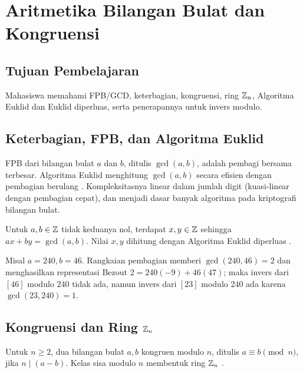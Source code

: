 \documentclass[../main.tex]{subfiles}
\begin{document}
\chapter{Aritmetika Bilangan Bulat dan Kongruensi}

\section{Tujuan Pembelajaran}
Mahasiswa memahami FPB/GCD, keterbagian, kongruensi, ring \(\mathbb{Z}_n\), Algoritma Euklid dan Euklid diperluas, serta penerapannya untuk invers modulo.

\section{Keterbagian, FPB, dan Algoritma Euklid}
\begin{definition}
FPB dari bilangan bulat \(a\) dan \(b\), ditulis \(\gcd(a,b)\), adalah pembagi bersama terbesar. Algoritma Euklid menghitung \(\gcd(a,b)\) secara efisien dengan pembagian berulang \citep{rosen}. Kompleksitasnya linear dalam jumlah digit (kuasi-linear dengan pembagian cepat), dan menjadi dasar banyak algoritma pada kriptografi bilangan bulat.
\end{definition}

\begin{theorem}
Untuk \(a,b\in\mathbb{Z}\) tidak keduanya nol, terdapat \(x,y\in\mathbb{Z}\) sehingga \(ax+by=\gcd(a,b)\). Nilai \(x,y\) dihitung dengan Algoritma Euklid diperluas \citep{hoffstein}.
\end{theorem}

\begin{example}
Misal \(a=240,b=46\). Rangkaian pembagian memberi \(\gcd(240,46)=2\) dan menghasilkan representasi Bezout \(2=240(-9)+46(47)\); maka invers dari \([46]\) modulo \(240\) tidak ada, namun invers dari \([23]\) modulo \(240\) ada karena \(\gcd(23,240)=1\).
\end{example}

\section{Kongruensi dan Ring \(\mathbb{Z}_n\)}
\begin{definition}[Kongruensi]
Untuk \(n\ge 2\), dua bilangan bulat \(a,b\) kongruen modulo \(n\), ditulis \(a\equiv b \pmod n\), jika \(n\mid (a-b)\). Kelas sisa modulo \(n\) membentuk ring \(\mathbb{Z}_n\) \citep{hoffstein}.
\end{definition}
\end{document}
